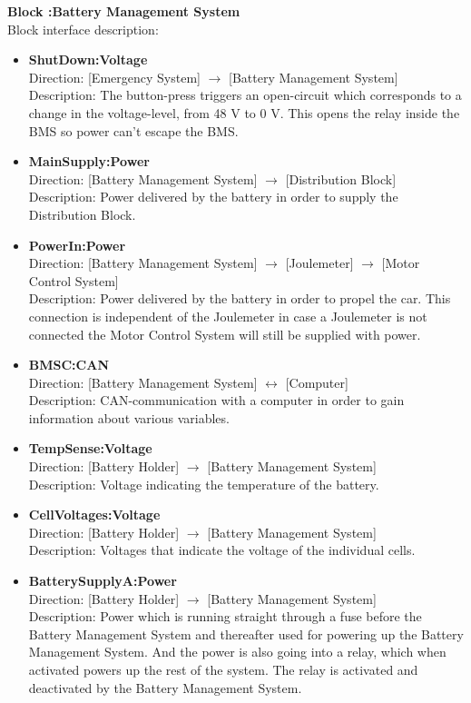 \textbf{Block :Battery Management System}\\
Block interface description:
\begin{itemize}
	\item \textbf{ShutDown:Voltage}\\
	Direction: [Emergency System] $\rightarrow$ [Battery Management System]\\
	Description: The button-press triggers an open-circuit which corresponds to a change in the voltage-level, from 48 V to 0 V. This opens the relay inside the BMS so power can't escape the BMS.
	\item \textbf{MainSupply:Power}\\
	Direction: [Battery Management System] $\rightarrow$ [Distribution Block]\\
	Description: Power delivered by the battery in order to supply the Distribution Block.
	\item \textbf{PowerIn:Power}\\
	Direction: [Battery Management System] $\rightarrow$ [Joulemeter] $\rightarrow$ [Motor Control System]\\
	Description: Power delivered by the battery in order to propel the car. This connection is independent of the Joulemeter in case a Joulemeter is not connected the Motor Control System will still be supplied with power.
	\item \textbf{BMSC:CAN}\\
	Direction: [Battery Management System] $\leftrightarrow$ [Computer]\\
	Description: CAN-communication with a computer in order to gain information about various variables.
	\item \textbf{TempSense:Voltage}\\
	Direction: [Battery Holder] $\rightarrow$ [Battery Management System]\\
	Description: Voltage indicating the temperature of the battery.
	\item \textbf{CellVoltages:Voltage}\\
	Direction: [Battery Holder] $\rightarrow$ [Battery Management System]\\
	Description: Voltages that indicate the voltage of the individual cells.
	\item \textbf{BatterySupplyA:Power}\\
	Direction: [Battery Holder] $\rightarrow$ [Battery Management System]\\
	Description: Power which is running straight through a fuse before the Battery Management System and thereafter used for powering up the Battery Management System. And the power is also going into a relay, which when activated powers up the rest of the system. The relay is activated and deactivated by the Battery Management System.
	
\end{itemize}

